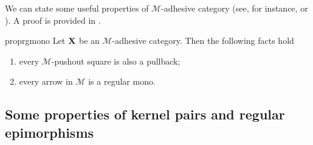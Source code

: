 \documentclass[3p]{elsarticle}
\def\C{\textbf {\textup{C}}}
\def\X{\textbf {\textup{X}}}
\theoremstyle{remark}
\theoremstyle{definition}
\begin{document}
\iffalse 
\begin{rem}\label{rem:deco}
We can point out an important property of strict $\mathcal{M}$-adhesive categories with pullbacks.  Consider the solid part of the cube aside, whose bottom case is an $\mathcal{M}$-pushout.
	
	\parbox{9.5cm}{	Given an arrow $d\colon X\to D$, we can present the object $X$ has a pushout: indeed, consider the following cube, in which all the three vertical squares are pullbacks.}
	\parbox{3cm}{
	\xymatrix@C=15pt@R=9pt{&V\ar[dd]|\hole_(.65){a}\ar[rr]^{v} \ar@{>.>}[dl]_{u} && Y \ar[dd]^{b} \ar@{>->}[dl]_{y} \\ Z  \ar[dd]_{c}\ar[rr]^(.7){z} & & X \ar[dd]_(.3){d}\\&A\ar[rr]|\hole^(.65){f} \ar@{>->}[dl]^{m} && B \ar@{>->}[dl]^{n} \\C \ar[rr]_{g} & & D }}

Now, notice that, since the front square is a pullback, then the dotted arrow $u\colon V\to Z$ exists. Moreover, the usual composition and decomposition property of pullbacks \cite{mac2013categories} entails that the left face of the cube so obtained is a pullback too, proving that $u$ is in $\mathcal{M}$ and that the top square is a pushout.

	Clearly if the arrow $p\colon X\to D$ is in $\mathcal{M}$, we can omit the assumptions of strictness and the existence of all pullbacks.
\end{rem}
\fi 


We can state some useful properties of $\mathcal{M}$-adhesive category
(see, for instance, \cite[Thm.~4.26]{ehrig2006fundamentals} or \cite[Fact 2.6]{azzi2019essence}). A proof is provided in .
\begin{restatable}{prop}{rgmono}\label{prop:regmono}
	Let $\X$ be an $\mathcal{M}$-adhesive category. Then the following facts hold
	\begin{enumerate}
		\item every $\mathcal{M}$-pushout square is also a pullback;
		\item every arrow in $\mathcal{M}$ is a regular mono.
	\end{enumerate}
\end{restatable}


\subsection{Some properties of kernel pairs and regular epimorphisms}
\end{document}

